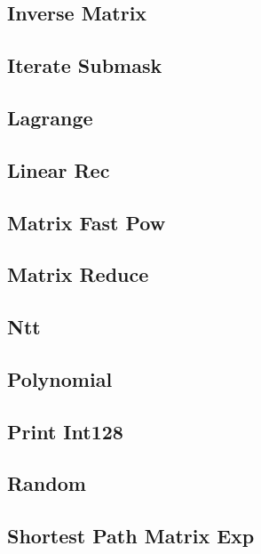 \documentclass[10pt,landscape,twocolumn,a4paper,notitlepage]{article}
\newcommand\cppfile[2][]{

}
\begin{document}
\subsection{Inverse Matrix}
\cppfile{math/inverse_matrix.cpp}

\subsection{Iterate Submask}
\cppfile{math/iterate_submask.cpp}

\subsection{Lagrange}
\cppfile{math/lagrange.cpp}

\subsection{Linear Rec}
\cppfile{math/linear_rec.cpp}

\subsection{Matrix Fast Pow}
\cppfile{math/matrix_fast_pow.cpp}

\subsection{Matrix Reduce}
\cppfile{math/matrix_reduce.cpp}

\subsection{Ntt}
\cppfile{math/ntt.cpp}

\subsection{Polynomial}
\cppfile{math/polynomial.cpp}

\subsection{Print Int128}
\cppfile{math/print_int128.cpp}

\subsection{Random}
\cppfile{math/random.cpp}

\subsection{Shortest Path Matrix Exp}
\cppfile{math/shortest_path_matrix_exp.cpp}
\end{document}
